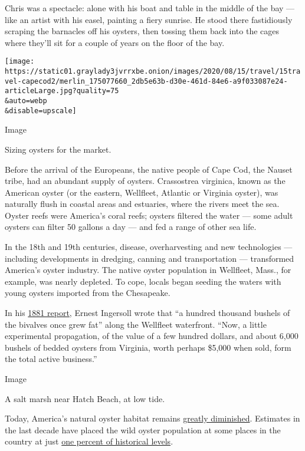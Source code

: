 Chris was a spectacle: alone with his boat and table in the middle of
the bay --- like an artist with his easel, painting a fiery sunrise. He
stood there fastidiously scraping the barnacles off his oysters, then
tossing them back into the cages where they'll sit for a couple of years
on the floor of the bay.

\texttt{[image: https://static01.graylady3jvrrxbe.onion/images/2020/08/15/travel/15travel-capecod2/merlin\_175077660\_2db5e63b-d30e-461d-84e6-a9f033087e24-articleLarge.jpg?quality=75\\\&auto=webp\\\&disable=upscale]}

Image

Sizing oysters for the market.

Before the arrival of the Europeans, the native people of Cape Cod, the
Nauset tribe, had an abundant supply of oysters. Crassostrea virginica,
known as the American oyster (or the eastern, Wellfleet, Atlantic or
Virginia oyster), was naturally flush in coastal areas and estuaries,
where the rivers meet the sea. Oyster reefs were America's coral reefs;
oysters filtered the water --- some adult oysters can filter 50 gallons
a day --- and fed a range of other sea life.

In the 18th and 19th centuries, disease, overharvesting and new
technologies --- including developments in dredging, canning and
transportation --- transformed America's oyster industry. The native
oyster population in Wellfleet, Mass., for example, was nearly depleted.
To cope, locals began seeding the waters with young oysters imported
from the Chesapeake.

In his
\href{https://play.google.com/books/reader?id=F6ATAAAAYAAJ\&pg=GBS.PA24}{1881
report}, Ernest Ingersoll wrote that ``a hundred thousand bushels of the
bivalves once grew fat'' along the Wellfleet waterfront. ``Now, a little
experimental propagation, of the value of a few hundred dollars, and
about 6,000 bushels of bedded oysters from Virginia, worth perhaps
\$5,000 when sold, form the total active business.''

Image

A salt marsh near Hatch Beach, at low tide.

Today, America's natural oyster habitat remains
\href{https://www.fisheries.noaa.gov/national/habitat-conservation/oyster-reef-habitat\#:~:text=Oysters\%20live\%20in\%20salty\%20or,other\%20marine\%20animals\%20and\%20plants.}{greatly
diminished}. Estimates in the last decade have placed the wild oyster
population at some places in the country at just
\href{https://www.outsideonline.com/2398648/oyster-farming-environment}{one
percent of historical levels}.

